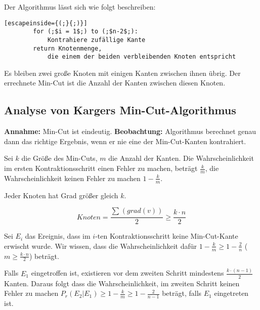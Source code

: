 \documentclass{scrartcl}%
\begin{document}
    Der Algorithmus lässt sich wie folgt beschreiben:

    \begin{lstlisting}[escapeinside={(;}{;)}]
        for (;$i = 1$;) to (;$n-2$;):
            Kontrahiere zufällige Kante
        return Knotenmenge,
            die einem der beiden verbleibenden Knoten entspricht
    \end{lstlisting}

    Es bleiben zwei große Knoten mit einigen Kanten zwischen ihnen übrig.
    Der errechnete Min-Cut ist die Anzahl der Kanten zwischen diesen Knoten.

    \subsection*{Analyse von Kargers Min-Cut-Algorithmus}\label{subsec:analyseVonKargersMincut-algorithmus}

    \textbf{\textsf{Annahme:}}  Min-Cut ist eindeutig.
    \newline
    \textbf{\textsf{Beobachtung:}} Algorithmus berechnet genau dann das richtige Ergebnis, wenn er nie eine der Min-Cut-Kanten kontrahiert.

    Sei $k$ die Größe des Min-Cuts, $m$ die Anzahl der Kanten.
    Die Wahrscheinlichkeit im ersten Kontraktionsschritt einen Fehler zu machen, beträgt $\frac{k}{m}$,
    die Wahrscheinlichkeit keinen Fehler zu machen $1-\frac{k}{m}$.

    {
        Jeder Knoten hat Grad größer gleich $k$.

        \begin{equation*}
            Knoten = \frac{\sum_{}^{}(grad(v))}{2} \geq \frac{k \cdot n}{2}
        \end{equation*}
    }

    Sei $E_i$ das Ereignis, dass im $i$-ten Kontraktionsschritt keine Min-Cut-Kante erwischt wurde.
    Wir wissen, dass die Wahrscheinlichkeit dafür $1-\frac{k}{m} \geq 1 - \frac{2}{n}$
    ($m \geq \frac{k \cdot n}{2}$) beträgt.

    Falls $E_1$ eingetroffen ist, existieren vor dem zweiten Schritt mindestens $\frac{k \cdot (n-1)}{2}$ Kanten.
    Daraus folgt dass die Wahrscheinlichkeit, im zweiten Schritt keinen Fehler zu machen
    $P_r(E_2 | E_1) \geq 1 - \frac{k}{m} \geq 1 - \frac{2}{n-1}$ beträgt, falls $E_1$ eingetreten ist.
\end{document}
